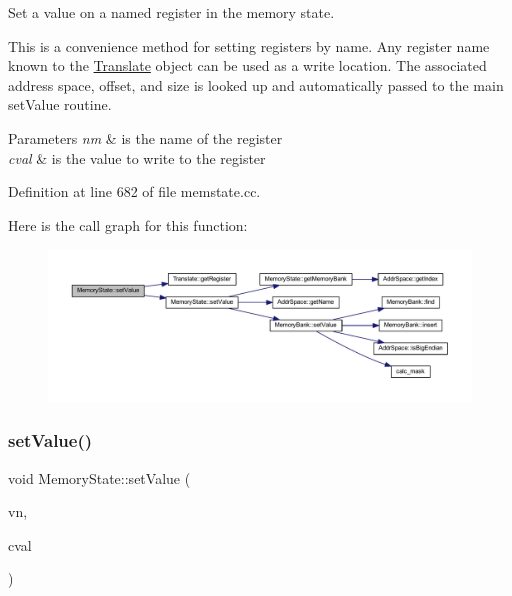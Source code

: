 Set a value on a named register in the memory state. 

This is a convenience method for setting registers by name. Any register name known to the \mbox{\hyperlink{class_translate}{Translate}} object can be used as a write location. The associated address space, offset, and size is looked up and automatically passed to the main set\+Value routine. 
\begin{DoxyParams}{Parameters}
{\em nm} & is the name of the register \\
\hline
{\em cval} & is the value to write to the register \\
\hline
\end{DoxyParams}


Definition at line 682 of file memstate.\+cc.

Here is the call graph for this function\+:
\nopagebreak
\begin{figure}[H]
\begin{center}
\leavevmode
\includegraphics[width=350pt]{class_memory_state_aec6679949faa142792307fee30506512_cgraph}
\end{center}
\end{figure}
\mbox{\label{class_memory_state_a9ec71816b195b33524214f82651a99cd}} 
\subsubsection{\texorpdfstring{setValue()}{setValue()}\hspace{0.1cm}{\footnotesize\ttfamily [3/3]}}
{\footnotesize\ttfamily void Memory\+State\+::set\+Value (\begin{DoxyParamCaption}\item[{const \mbox{\hyperlink{struct_varnode_data}{Varnode\+Data}} $\ast$}]{vn,  }\item[{\mbox{\hyperlink{types_8h_a2db313c5d32a12b01d26ac9b3bca178f}{uintb}}}]{cval }\end{DoxyParamCaption})\hspace{0.3cm}{\ttfamily [inline]}}



